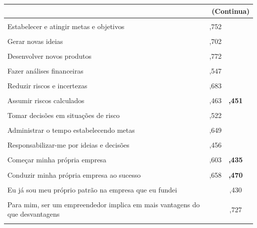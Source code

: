 \begin{apendicesenv}
\begin{longtable}[H]{p{6cm} c c c }
\endhead

\hline \multicolumn{4}{r}{\textbf{(Continua)}} \\ \hline


\endfoot
\hline \multicolumn{4}{r}{\textbf{(Conclusão)}} \\ \hline
\hline \hline

\endlastfoot


Estabelecer e atingir metas e objetivos
 &  ,752 & & \\\\
 
Gerar novas ideias
 &  ,702 & & \\\\
 
Desenvolver novos produtos
 &  ,772 & & \\\\
 
Fazer análises financeiras
 &  ,547 & & \\\\
 
Reduzir riscos e incertezas
 &  ,683 &  & \\\\
 
Assumir riscos calculados
 &   ,463 & \textbf{,451} & \\\\
 
Tomar decisões em situações de risco
 &   ,522 & & \\\\
 
Administrar o tempo estabelecendo metas
 &   ,649 & & \\\\
 
Responsabilizar-me por ideias e decisões
 & ,456 & &  \\\\
 
Começar minha própria empresa
& ,603 & \textbf{,435}  & \\\\

Conduzir minha própria empresa ao sucesso
 & ,658 & \textbf{,470}  & \\\\
Eu já sou meu próprio patrão na empresa que eu fundei
 & & ,430 &  \\\\

Para mim, ser um empreendedor implica em mais vantagens do que desvantagens
 &  & ,727  & \\\\
 

\end{longtable}
\end{apendicesenv}
